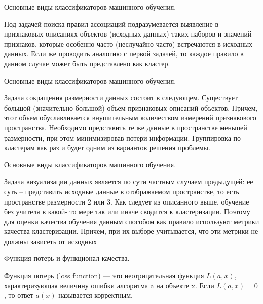 \documentclass[10pt,pdf,hyperref={unicode}]{beamer}
\begin{document}
\begin{frame}{Основные виды классификаторов машинного обучения.}

Под задачей поиска правил ассоциаций подразумевается
выявление в признаковых описаниях объектов (исходных данных)
таких наборов и значений признаков, которые особенно часто
(неслучайно часто) встречаются в исходных данных. Если же
проводить аналогию с первой задачей, то каждое правило в данном
случае может быть представлено как кластер.

\end{frame}


\begin{frame}{Основные виды классификаторов машинного обучения.}


Задача сокращения размерности данных состоит в следующем.
Существует большой (значительно большой) объем признаковых
описаний объектов. Причем, этот объем обуславливается
внушительным количеством измерений признакового пространства.
Необходимо представить те же данные в пространстве меньшей
размерности, при этом минимизировав потери информации.
Группировка по кластерам как раз и будет одним из вариантов
решения проблемы.
\end{frame}


\begin{frame}{Основные виды классификаторов машинного обучения.}


Задача визуализации данных является по сути частным случаем
предыдущей: ее суть – представить исходные данные в отображаемом
пространстве, то есть пространстве размерности 2 или 3.
Как следует из описанного выше, обучение без учителя в какой-
то мере так или иначе сводится к кластеризации. Поэтому для оценки
качества обучения данным способом как правило используют
метрики качества кластеризации. Причем, при их выборе
учитывается, что эти метрики не должны зависеть от исходных

\end{frame}






\begin{frame}{Функция потерь и функционал качества.}

Функция потерь (loss function) — это неотрицательная функция $L (a, x)$,
характеризующая величину ошибки алгоритма a на объекте x. Если $L (a, x) = 0$,
то ответ $a(x)$ называется корректным.



\end{frame}
\end{document}
